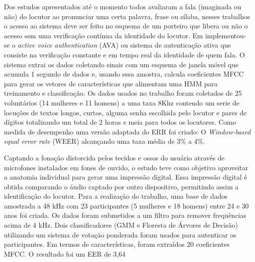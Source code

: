 			\par Dos estudos apresentados até o momento todos avaliaram a fala (imaginada ou não) do locutor ao pronunciar uma certa palavra, frase ou sílaba, nesses trabalhos o acesso ao sistema deve ser feito no esquema de um porteiro que libera ou não o acesso sem uma verificação contínua da identidade do locutor. Em \cite{WOS:000525844000004} implementou-se o \textit{active voice authentication} (AVA) ou sistema de autenticação ativa que consiste na verificação constante e em tempo real da identidade de quem fala. O sistema extrai os dados coletando sinais com um esquema de janela móvel que acumula 1 segundo de dados e, usando essa amostra, calcula coeficientes MFCC para gerar os vetores de características que alimentam uma HMM para treinamento e classificação. Os dados usados no trabalho foram coletados de 25 voluntários (14 mulheres e 11 homens) a uma taxa 8Khz contendo um serie de locuções de textos longos, curtos, alguma senha escolhida pelo locutor e pares de dígitos totalizando um total de 2 horas e meia para todos os locutores. Como medida de desempenho uma versão adaptada do ERR foi criado: O \textit{Window-based equal error rate} (WEER) alcançando uma taxa média de 3\% a 4\%.
			
			\par Captando a fonação distorcida pelos tecidos e ossos do usuário através de microfones instalados em fones de ouvido, o estudo \cite{10.1145/3448113} teve como objetivo aproveitar a anatomia individual para gerar uma impressão digital. Essa impressão digital é obtida comparando o áudio captado por outro dispositivo, permitindo assim a identificação do locutor. Para a realização do trabalho, uma base de dados amostrada a 48 kHz com 23 participantes (5 mulheres e 18 homens) entre 24 e 30 anos foi criada. Os dados foram submetidos a um filtro para remover frequências acima de 4 kHz. Dois classificadores (GMM e Floresta de Árvores de Decisão) utilizando um sistema de votação ponderada foram usados para autenticar os participantes. Em termos de características, foram extraídos 20 coeficientes MFCC. O resultado foi um EER de 3,64%
			
